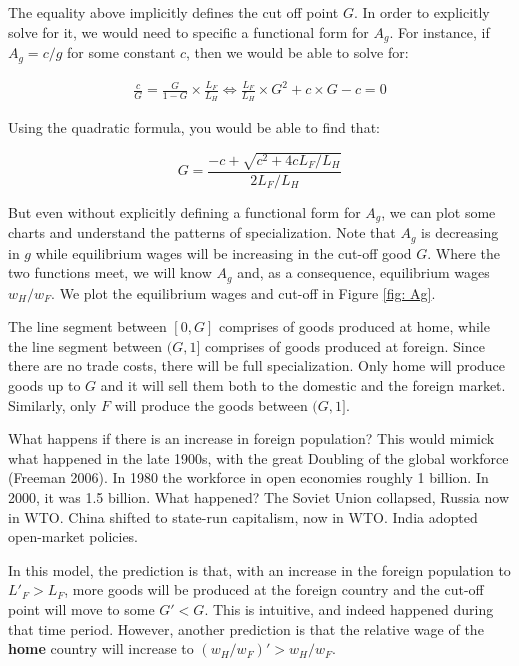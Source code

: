 \documentclass[11pt,letterpaper]{article}
\begin{document}
The equality above implicitly defines the cut off point $G$. In order to explicitly solve for it, we would need to specific a functional form for $A_g$. For instance, if $A_g = c / g$ for some constant $c$, then we would be able to solve for:

\begin{eqnarray*}
    \frac{c}{G} = \frac{G}{1-G} \times \frac{ L_F }{L_H} \iff \frac{ L_F }{L_H} \times G^2  + c \times G -c =0 
\end{eqnarray*}

Using the quadratic formula, you would be able to find that:

\begin{equation*}
    G = \frac{-c + \sqrt{c^2 + 4 c L_F / L_H}}{2  L_F / L_H }
\end{equation*}

But even without explicitly defining a functional form for $A_g$, we can plot some charts and understand the patterns of specialization. Note that $A_g$ is decreasing in $g$ while equilibrium wages will be increasing in the cut-off good $G$. Where the two functions meet, we will know $A_g$ and, as a consequence, equilibrium wages $w_H/w_F$. We plot the equilibrium wages and cut-off in Figure \ref{fig: Ag}.

The line segment between $[0,G]$ comprises of goods produced at home, while the line segment between $(G,1]$ comprises of goods produced at foreign. Since there are no trade costs, there will be full specialization. Only home will produce goods up to $G$ and it will sell them both to the domestic and the foreign market. Similarly, only $F$ will produce the goods between $(G,1]$.

What happens if there is an increase in foreign population? This would mimick what happened in the late 1900s, with the great Doubling of the global workforce (Freeman 2006). In 1980 the workforce in open economies roughly 1 billion. In 2000, it was 1.5 billion. What happened? The Soviet Union collapsed, Russia now in WTO. China shifted to state-run capitalism, now in WTO. India adopted open-market policies.

In this model, the prediction is that, with an increase in the foreign population to $L'_F >L_F$, more goods will be produced at the foreign country and the cut-off point will move to some $G' < G$. This is intuitive, and indeed happened during that time period. However, another prediction is that the relative wage of the \textbf{home} country will increase to $(w_H/w_F)'>w_H/w_F$.
\end{document}
